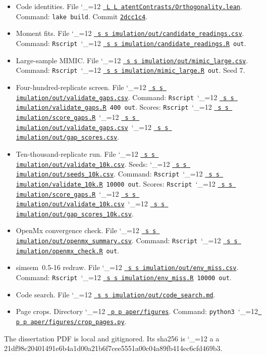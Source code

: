 \documentclass[11pt]{article}
\makeatletter
\newcommand{\sha}{\begingroup\catcode`\_=12 \sha@read}
\newcommand{\sha@read}[1]{\ttfamily\sha@loop#1\relax\endgroup}
\def\sha@loop#1{%
  \ifx\relax#1\else
    #1\allowbreak
    \expandafter\sha@loop
  \fi}
\newcommand{\proofcommit}{9503d03d8da8bacc42ef4e1b11dcae3a9cb86056}
\newcommand{\proofbase}{https://github.com/alectionary/vibe-math/blob/master/formalization/latent-contrasts}
\def\latent@show#1{%
  \ifx\relax#1\else
    #1\allowbreak
    \expandafter\latent@show
  \fi}
\newcommand{\src}{\begingroup\catcode`\_=12 \latent@src}
\newcommand{\latent@src}[1]{%
  \edef\srcurl{\proofbase/#1}%
  \href{\srcurl}{\texttt{\latent@show#1\relax}}\endgroup}
\newcommand{\srcat}{\begingroup\catcode`\_=12 \latent@srcat}
\newcommand{\latent@srcat}[2]{%
  \edef\srcurl{\proofbase/#1\#L#2}%
  \href{\srcurl}{\texttt{\latent@show#1\relax}}\endgroup}
\newcommand{\srcdir}{\begingroup\catcode`\_=12 \latent@dir}
\newcommand{\latent@dir}[1]{%
  \edef\srcurl{https://github.com/alectionary/vibe-math/tree/master/formalization/latent-contrasts/#1}%
  \href{\srcurl}{\texttt{\latent@show#1\relax}}\endgroup}
\makeatother
\begin{document}
\begin{itemize}
\item Code identities. File \srcat{LatentContrasts/Orthogonality.lean}{123}.
Command: \texttt{lake build}. Commit \href{https://github.com/alectionary/vibe-math/commit/\proofcommit}{\texttt{2dcc1c4}}.
\item Moment fits. File \src{simulation/out/candidate_readings.csv}.
Command: \texttt{Rscript}~\srcat{simulation/candidate_readings.R}{103}~\texttt{out}.
\item Large-sample MIMIC. File \src{simulation/out/mimic_large.csv}.
Command: \texttt{Rscript}~\srcat{simulation/mimic_large.R}{10}~\texttt{out}. Seed \(7\).
\item Four-hundred-replicate screen.
File \src{simulation/out/validate_gaps.csv}.
Command: \texttt{Rscript}~\srcat{simulation/validate_gaps.R}{122}~\texttt{400 out}.
Scores: \texttt{Rscript}~\srcat{simulation/score_gaps.R}{103}~\src{simulation/out/validate_gaps.csv}~\src{simulation/out/gap_scores.csv}.
\item Ten-thousand-replicate run.
File \src{simulation/out/validate_10k.csv}.
Seeds: \src{simulation/out/seeds_10k.csv}.
Command: \texttt{Rscript}~\srcat{simulation/validate_10k.R}{126}~\texttt{10000 out}.
Scores: \texttt{Rscript}~\srcat{simulation/score_gaps.R}{103}~\src{simulation/out/validate_10k.csv}~\src{simulation/out/gap_scores_10k.csv}.
\item OpenMx convergence check.
File \src{simulation/out/openmx_summary.csv}.
Command: \texttt{Rscript}~\srcat{simulation/openmx_check.R}{172}~\texttt{out}.
\item simsem~0.5-16 redraw.
File \src{simulation/out/env_miss.csv}.
Command: \texttt{Rscript}~\srcat{simulation/env_miss.R}{126}~\texttt{10000 out}.
\item Code search. File \src{simulation/out/code_search.md}.
\item Page crops. Directory \srcdir{paper/figures}.
Command: \texttt{python3}~\srcat{paper/figures/crop_pages.py}{90}.
\end{itemize}

The dissertation PDF is local and gitignored. Its sha256 is
\sha{a21df98c20401491e6b4a1d00a21b6f7cee5551a00c04a89fb414ec6cfd469b3}.
\end{document}
